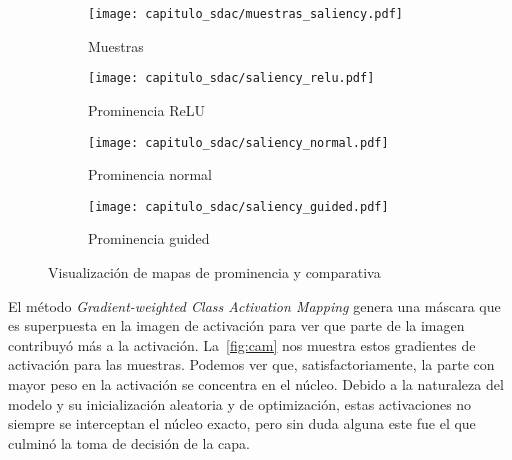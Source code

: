   \begin{figure}[H] 
    \begin{subfigure}[b]{0.5\linewidth}
      \centering
      \texttt{[image: capitulo\_sdac/muestras\_saliency.pdf]} 
      \caption{Muestras}\label{fig7:a} 
      \vspace{4ex}
    \end{subfigure}%
    \begin{subfigure}[b]{0.5\linewidth}
      \centering
      \texttt{[image: capitulo\_sdac/saliency\_relu.pdf]} 
      \caption{Prominencia ReLU}\label{fig7:b} 
      \vspace{4ex}
    \end{subfigure} 
    \begin{subfigure}[b]{0.5\linewidth}
      \centering
      \texttt{[image: capitulo\_sdac/saliency\_normal.pdf]} 
      \caption{Prominencia normal}\label{fig7:c} 
    \end{subfigure}%
    \begin{subfigure}[b]{0.5\linewidth}
      \centering
      \texttt{[image: capitulo\_sdac/saliency\_guided.pdf]} 
      \caption{Prominencia guided}\label{fig7:d} 
    \end{subfigure} 
    \caption{Visualización de mapas de prominencia y comparativa}\label{fig:saliency} 
  \end{figure}

  El método \emph{Gradient-weighted Class Activation Mapping} genera una máscara
  que es superpuesta en la imagen de activación para ver que parte de la imagen
  contribuyó más a la activación. La~\autoref{fig:cam} nos muestra estos
  gradientes de activación para las muestras. Podemos ver que,
  satisfactoriamente, la parte con mayor peso en la activación se concentra en
  el núcleo. Debido a la naturaleza del modelo y su inicialización aleatoria y
  de optimización, estas activaciones no siempre se interceptan el núcleo exacto,
  pero sin duda alguna este fue el que culminó la toma de decisión de la capa.

